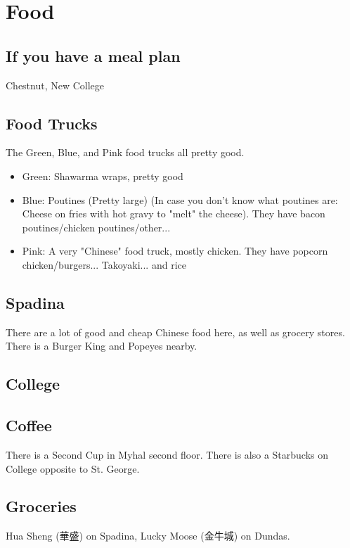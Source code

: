 \section{Food}

\subsection{If you have a meal plan}

Chestnut, New College

\subsection{Food Trucks}

The Green, Blue, and Pink food trucks all pretty good. 

\begin{itemize}
    \item Green: Shawarma wraps, pretty good
    \item Blue: Poutines (Pretty large) (In case you don't know what poutines are: Cheese on fries with hot gravy to "melt" the cheese). They have bacon poutines/chicken poutines/other...
    \item Pink: A very "Chinese" food truck, mostly chicken. They have popcorn chicken/burgers... Takoyaki... and rice
\end{itemize}

\subsection{Spadina}

There are a lot of good and cheap Chinese food here, as well as grocery stores. There is a Burger King and Popeyes nearby.

\subsection{College}


\subsection{Coffee}

There is a Second Cup in Myhal second floor. There is also a Starbucks on College opposite to St. George.

\subsection{Groceries}

Hua Sheng (華盛) on Spadina, Lucky Moose (金牛城) on Dundas.
